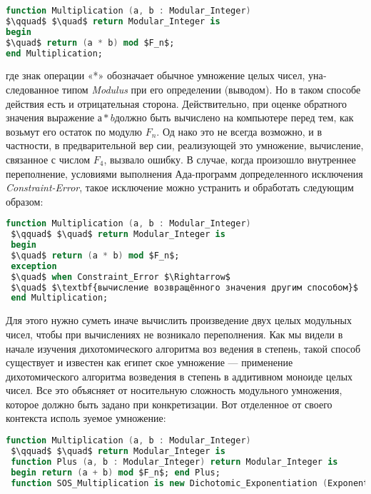 \newpage

\begin{lstlisting}[mathescape=true, language=Ada, basicstyle=\small]
function Multiplication (a, b : Modular_Integer)
$\qquad$ $\quad$ return Modular_Integer is
begin
$\quad$ return (a * b) mod $F_n$;
end Multiplication;
\end{lstlisting}

где знак операции «*» обозначает обычное умножение целых чисел, уна­
следованное типом {\it Modulus} при его определении (выводом). Но в таком
способе действия есть и отрицательная сторона. Действительно, при
оценке обратного значения выражение $а * b $должно быть вычислено на
компьютере перед тем, как возьмут его остаток по модулю $F_n$. Од­
нако это не всегда возможно, и в частности, в предварительной вер­
сии, реализующей это умножение, вычисление, связанное с числом $F_4$,
вызвало ошибку. В случае, когда произошло внутреннее переполнение,
условиями выполнения Ада-программ 
допределенного исключения {\it Constraint-Error}, такое исключение можно
устранить и обработать следующим образом:

\begin{lstlisting}[mathescape=true, language=Ada, basicstyle=\small]
 function Multiplication (a, b : Modular_Integer)
 $\qquad$ $\quad$ return Modular_Integer is
 begin
 $\quad$ return (a * b) mod $F_n$;
 exception
 $\quad$ when Constraint_Error $\Rightarrow$
 $\quad$ $\textbf{вычисление возвращённого значения другим способом}$
 end Multiplication;
 \end{lstlisting}
 
 Для этого нужно суметь иначе вычислить произведение двух целых
модульных чисел, чтобы при вычислениях не возникало переполнения.
Как мы видели в начале изучения дихотомического алгоритма воз­
ведения в степень, такой способ существует и известен как египет­
ское умножение — применение дихотомического алгоритма возведения
в степень в аддитивном моноиде целых чисел. Все это объясняет от­
носительную сложность модульного умножения, которое должно быть
задано при конкретизации. Вот отделенное от своего контекста исполь­
зуемое умножение:
\begin{lstlisting}[mathescape=true, language=Ada,  basicstyle=\small]
function Multiplication (a, b : Modular_Integer)
 $\qquad$ $\quad$ return Modular_Integer is
 function Plus (a, b : Modular_Integer) return Modular_Integer is
 begin return (a + b) mod $F_n$; end Plus;
 function SOS_Multiplication is new Dichotomic_Exponentiation (Exponent $\Rightarrow$ Modular_Integer, Monoid_Element $\Rightarrow$ Modular_Integer, "*" $\Rightarrow$ Plus, Monoid_Unit $\Rightarrow$ 0);
 \end{lstlisting}
 
